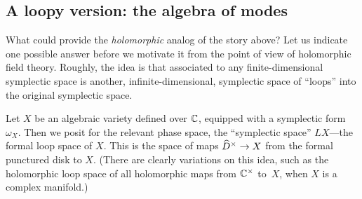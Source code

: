 \documentclass[11pt]{amsart}
\def\brian#1{{\textcolor{blue!75!red}{BW: {#1}}}}
\def\owen#1{{\textcolor{red!50!black}{OG: {#1}}}}
\begin{document}
%

\subsection{A loopy version: the algebra of modes}

What could provide the {\em holomorphic} analog of the story above?
Let us indicate one possible answer before we motivate it from the point of view of holomorphic field theory.
Roughly, the idea is that associated to any finite-dimensional symplectic space is another, infinite-dimensional, symplectic space of ``loops'' into the original symplectic space.


Let $X$ be an algebraic variety defined over $\CC$, equipped with a symplectic form $\omega_X$.
Then we posit for the relevant phase space, the ``symplectic space'' $LX$---the formal loop space of $X$.
This is the space of maps $\Hat{D}^\times \to X$ from the formal punctured disk to $X$.
%
(There are clearly variations on this idea, such as the holomorphic loop space of all holomorphic maps from $\CC^\times$ to~$X$, when $X$ is a complex manifold.)
\end{document}

